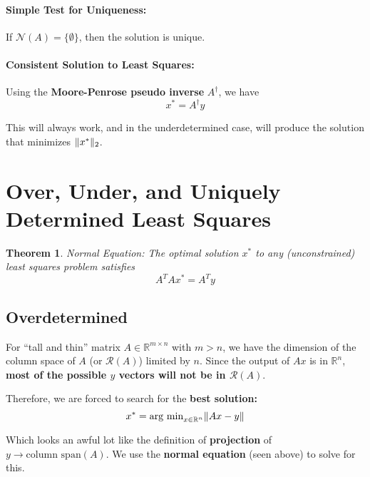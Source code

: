 \documentclass[a4paper,12pt]{report}
\DeclarePairedDelimiter\norm{\lVert}{\rVert}%
\newtheorem{theorem}{Theorem}
\begin{document}
\paragraph{Simple Test for Uniqueness: } If $\mathcal{N}(A) = \{\emptyset\}$, then the solution is unique.

\paragraph{Consistent Solution to Least Squares: } Using the \textbf{Moore-Penrose pseudo inverse} $A^\dagger$, we have 
\begin{equation}
x^* = A^\dagger y
\end{equation}

This will always work, and in the underdetermined case, will produce the solution that minimizes $\norm{x^*}_2$.



\section{Over, Under, and Uniquely Determined Least Squares}

\begin{theorem}{Normal Equation:}
The optimal solution $x^*$ to any (unconstrained) least squares problem satisfies
\begin{equation}
A^T A x^* = A^T y
\end{equation}
\end{theorem}



\subsection{Overdetermined}

For ``tall and thin'' matrix $A\in \mathbb{R}^{m\times n}$ with $m > n$, we have the dimension of the column space of $A$ (or $\mathcal{R}(A)$) limited by $n$. Since the output of $Ax$ is in $\mathbb{R}^n$, \textbf{most of the possible $y$ vectors will not be in $\mathcal{R}(A)$}.


Therefore, we are forced to search for the \textbf{best solution:} 
\begin{equation}
x^* = \text{arg min}_{x\in \mathbb{R}^n} \norm{Ax-y}
\end{equation}

Which looks an awful lot like the definition of \textbf{projection} of $y \to \text{column span}(A)$. We use the \textbf{normal equation} (seen above) to solve for this.
\end{document}
